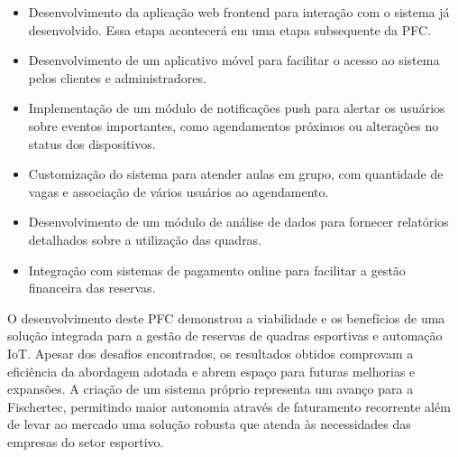 \begin{itemize}
  \item Desenvolvimento da aplicação web frontend para interação com o sistema já desenvolvido. Essa etapa acontecerá em uma etapa subsequente da \acrshort{PFC}.
  \item Desenvolvimento de um aplicativo móvel para facilitar o acesso ao sistema pelos clientes e administradores.
  \item Implementação de um módulo de notificações push para alertar os usuários sobre eventos importantes, como agendamentos próximos ou alterações no status dos dispositivos.
  \item Customização do sistema para atender aulas em grupo, com quantidade de vagas e associação de vários usuários ao agendamento.
  \item Desenvolvimento de um módulo de análise de dados para fornecer relatórios detalhados sobre a utilização das quadras.
  \item Integração com sistemas de pagamento online para facilitar a gestão financeira das reservas.
\end{itemize}

O desenvolvimento deste PFC demonstrou a viabilidade e os benefícios de uma solução integrada para a gestão de reservas de quadras esportivas e automação \acrshort{IoT}. Apesar dos desafios encontrados, os resultados obtidos comprovam a eficiência da abordagem adotada e abrem espaço para futuras melhorias e expansões. A criação de um sistema próprio representa um avanço para a Fischertec, permitindo maior autonomia através de faturamento recorrente além de levar ao mercado uma solução robusta que atenda às necessidades das empresas do setor esportivo.